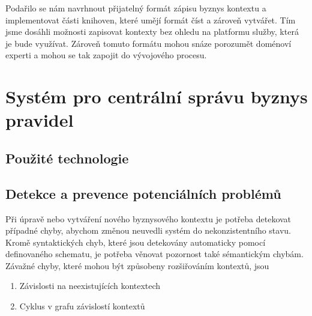 Podařilo se nám navrhnout přijatelný formát zápisu byznys kontextu
a implementovat části knihoven, které umějí formát číst a zároveň vytvářet.
Tím jsme dosáhli možnosti zapisovat kontexty bez ohledu na platformu
služby, která je bude využívat. Zároveň tomuto formátu mohou
snáze porozumět doménoví experti a mohou se tak zapojit do
vývojového procesu.



\section{Systém pro centrální správu byznys pravidel}


\subsection{Použité technologie}


\subsection{Detekce a prevence potenciálních problémů}

Při úpravě nebo vytváření nového byznysového kontextu je
potřeba detekovat případné chyby, abychom změnou neuvedli
systém do nekonzistentního stavu. Kromě syntaktických chyb,
které jsou detekovány automaticky pomocí definovaného schematu,
je potřeba věnovat pozornost také sémantickým chybám.
Závažné chyby, které mohou být způsobeny rozšiřováním kontextů, jsou
\begin{enumerate}[label=\alph*)]
    \item Závislosti na neexistujících kontextech
    \item Cyklus v grafu závislostí kontextů
\end{enumerate}

